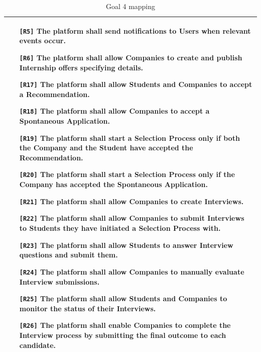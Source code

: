 \begin{table}[H]
\begin{tabular}{|p{15cm}|}
\begin{itemize}
            \item[\texttt{[R5]}] The platform shall send notifications to Users when relevant events occur.
            \item[\texttt{[R6]}] The platform shall allow Companies to create and publish Internship offers specifying details.
            \item[\texttt{[R17]}] The platform shall allow Students and Companies to accept a Recommendation.
            \item[\texttt{[R18]}] The platform shall allow Companies to accept a Spontaneous Application.
            \item[\texttt{[R19]}] The platform shall start a Selection Process only if both the Company and the Student have accepted the Recommendation.
            \item[\texttt{[R20]}] The platform shall start a Selection Process only if the Company has accepted the Spontaneous Application.
            \item[\texttt{[R21]}] The platform shall allow Companies to create Interviews.
            \item[\texttt{[R22]}] The platform shall allow Companies to submit Interviews to Students they have initiated a Selection Process with.
            \item[\texttt{[R23]}] The platform shall allow Students to answer Interview questions and submit them.
            \item[\texttt{[R24]}] The platform shall allow Companies to manually evaluate Interview submissions.
            \item[\texttt{[R25]}] The platform shall allow Students and Companies to monitor the status of their Interviews.
            \item[\texttt{[R26]}] The platform shall enable Companies to complete the Interview process by submitting the final outcome to each candidate.
        \end{itemize} \\ \hline
    \end{tabular}
    \caption{Goal 4 mapping}
    \label{tab:G4}
\end{table}

